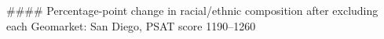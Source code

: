 #### Percentage-point change in racial/ethnic composition after excluding each Geomarket: San Diego, PSAT score 1190–1260
